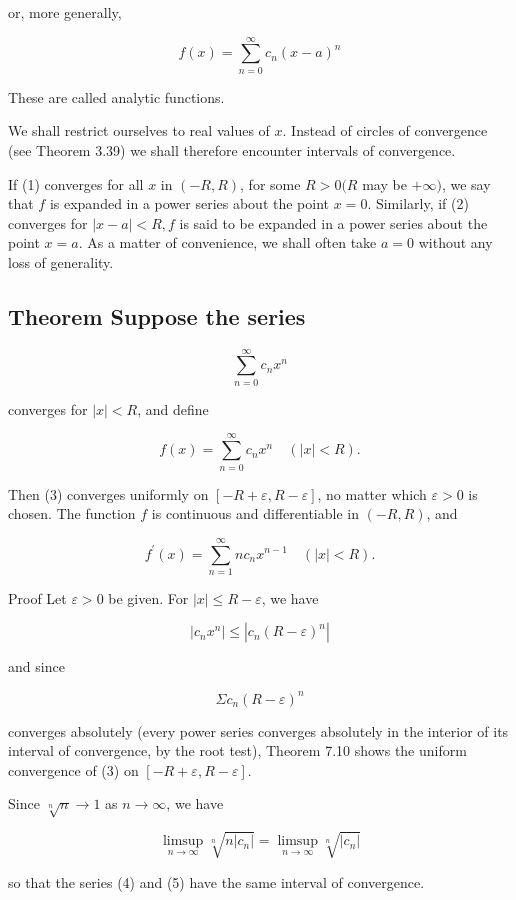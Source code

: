 \documentclass[10pt]{article}
\begin{document}
or, more generally,

$$
f(x)=\sum_{n=0}^{\infty} c_{n}(x-a)^{n}
$$

These are called analytic functions.

We shall restrict ourselves to real values of $x$. Instead of circles of convergence (see Theorem 3.39) we shall therefore encounter intervals of convergence.

If (1) converges for all $x$ in $(-R, R)$, for some $R>0(R$ may be $+\infty)$, we say that $f$ is expanded in a power series about the point $x=0$. Similarly, if (2) converges for $|x-a|<R, f$ is said to be expanded in a power series about the point $x=a$. As a matter of convenience, we shall often take $a=0$ without any loss of generality.

\subsection{Theorem Suppose the series}
$$
\sum_{n=0}^{\infty} c_{n} x^{n}
$$

converges for $|x|<R$, and define

$$
f(x)=\sum_{n=0}^{\infty} c_{n} x^{n} \quad(|x|<R) .
$$

Then (3) converges uniformly on $[-R+\varepsilon, R-\varepsilon]$, no matter which $\varepsilon>0$ is chosen. The function $f$ is continuous and differentiable in $(-R, R)$, and

$$
f^{\prime}(x)=\sum_{n=1}^{\infty} n c_{n} x^{n-1} \quad(|x|<R) .
$$

Proof Let $\varepsilon>0$ be given. For $|x| \leq R-\varepsilon$, we have

$$
\left|c_{n} x^{n}\right| \leq\left|c_{n}(R-\varepsilon)^{n}\right|
$$

and since

$$
\Sigma c_{n}(R-\varepsilon)^{n}
$$

converges absolutely (every power series converges absolutely in the interior of its interval of convergence, by the root test), Theorem 7.10 shows the uniform convergence of (3) on $[-R+\varepsilon, R-\varepsilon]$.

Since $\sqrt[n]{n} \rightarrow 1$ as $n \rightarrow \infty$, we have

$$
\limsup _{n \rightarrow \infty} \sqrt[n]{n\left|c_{n}\right|}=\limsup _{n \rightarrow \infty} \sqrt[n]{\left|c_{n}\right|}
$$

so that the series (4) and (5) have the same interval of convergence.
\end{document}
